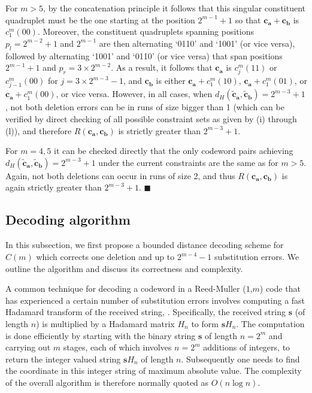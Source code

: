 For $m>5$, by the concatenation principle it follows that this
singular constituent quadruplet must be the one starting at the
position $2^{m-1}+1$ so that $\mathbf{c_a}+\mathbf{c_b}$ is
$c_1^m(00)$. Moreover, the constituent quadruplets spanning
positions $p_l=2^{m-2}+1$ and $2^{m-1}$ are then alternating
`0110' and `1001' (or vice versa), followed by alternating `1001'
and `0110' (or vice versa) that span positions $2^{m-1}+1$ and
$p_r=3\times 2^{m-2}$. As a result, it follows that $\mathbf{c_a}$
is $c_j^m(11)$ or $c_{j-1}^m(00)$ for $j=3\times 2^{m-3}-1$, and
$\mathbf{c_b}$ is either $\mathbf{c_a}+c_1^m(10)$,
$\mathbf{c_a}+c_1^m(01)$, or $\mathbf{c_a}+c_1^m(00)$, or vice
versa. However, in all cases, when
$d_{H}(\mathbf{\tilde{c}_a},\mathbf{\tilde{c}_b})=2^{m-3}+1$, not
both deletion errors can be in runs of size bigger than 1 (which
can be verified by direct checking of all possible constraint sets
as given by (i) through (l)), and therefore
$R(\mathbf{c_a},\mathbf{c_b})$ is strictly greater than
$2^{m-3}+1$.

For $m =4, 5$ it can be checked directly that the only codeword
pairs achieving
$d_{H}(\mathbf{\tilde{c}_a},\mathbf{\tilde{c}_b})=2^{m-3}+1$ under
the current constraints are the same as for $m>5$. Again, not both
deletions can occur in runs of size 2, and thus
$R(\mathbf{c_a},\mathbf{c_b})$ is again strictly greater than
$2^{m-3}+1$. \hfill$\blacksquare$



\subsection{Decoding algorithm}

In this subsection, we first propose a bounded distance decoding scheme for
${\hat C}(m)$ which corrects
one deletion and up to $2^{m-4}-1$ substitution errors. We outline the algorithm and discuss its correctness and complexity.


A common technique for decoding a codeword in a
Reed-Muller ($1$,$m$) code that has experienced a certain number
of substitution errors involves computing a fast Hadamard
transform of the received string, \cite[$\S$4, Ch.14]{mws:77}. Specifically, the received string
$\mathbf{s}$ (of length $n$) is multiplied by a
Hadamard matrix $H_n$ to form
$\mathbf{s} H_n$. The computation
is done efficiently by starting with the
binary string $\mathbf{s}$ of length
$n =2^m$ and carrying out $m$ stages, each of which
involves $n = 2^m$ additions of integers, to return
the
integer valued string $\mathbf{s} H_n$ of length
$n$. Subsequently one needs to
find the coordinate in this integer string of maximum absolute
value. The complexity of the overall algorithm is therefore
normally quoted as $O(n \log n)$.

